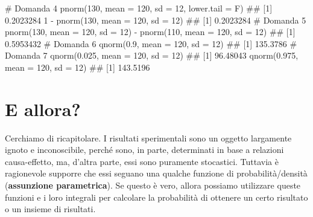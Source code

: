 \documentclass[a4paper,12pt,oneside]{book}
\newenvironment{Shaded}{\begin{snugshade}}{\end{snugshade}}
\newcommand{\DecValTok}[1]{#1}
\newcommand{\FloatTok}[1]{#1}
\newcommand{\SpecialCharTok}[1]{#1}
\newcommand{\CommentTok}[1]{#1}
\newcommand{\DocumentationTok}[1]{#1}
\newcommand{\FunctionTok}[1]{#1}
\newcommand{\AttributeTok}[1]{#1}
\newcommand{\NormalTok}[1]{#1}
\begin{document}
\begin{Shaded}
\begin{Highlighting}[]
\CommentTok{\# Domanda 4}
\FunctionTok{pnorm}\NormalTok{(}\DecValTok{130}\NormalTok{, }\AttributeTok{mean =} \DecValTok{120}\NormalTok{, }\AttributeTok{sd =} \DecValTok{12}\NormalTok{, }\AttributeTok{lower.tail =}\NormalTok{ F)}
\DocumentationTok{\#\# [1] 0.2023284}
\DecValTok{1} \SpecialCharTok{{-}} \FunctionTok{pnorm}\NormalTok{(}\DecValTok{130}\NormalTok{, }\AttributeTok{mean =} \DecValTok{120}\NormalTok{, }\AttributeTok{sd =} \DecValTok{12}\NormalTok{)}
\DocumentationTok{\#\# [1] 0.2023284}
\CommentTok{\# Domanda 5}
\FunctionTok{pnorm}\NormalTok{(}\DecValTok{130}\NormalTok{, }\AttributeTok{mean =} \DecValTok{120}\NormalTok{, }\AttributeTok{sd =} \DecValTok{12}\NormalTok{) }\SpecialCharTok{{-}} \FunctionTok{pnorm}\NormalTok{(}\DecValTok{110}\NormalTok{, }\AttributeTok{mean =} \DecValTok{120}\NormalTok{, }\AttributeTok{sd =} \DecValTok{12}\NormalTok{)}
\DocumentationTok{\#\# [1] 0.5953432}
\CommentTok{\# Domanda 6}
\FunctionTok{qnorm}\NormalTok{(}\FloatTok{0.9}\NormalTok{, }\AttributeTok{mean =} \DecValTok{120}\NormalTok{, }\AttributeTok{sd =} \DecValTok{12}\NormalTok{)}
\DocumentationTok{\#\# [1] 135.3786}
\CommentTok{\# Domanda 7}
\FunctionTok{qnorm}\NormalTok{(}\FloatTok{0.025}\NormalTok{, }\AttributeTok{mean =} \DecValTok{120}\NormalTok{, }\AttributeTok{sd =} \DecValTok{12}\NormalTok{)}
\DocumentationTok{\#\# [1] 96.48043}
\FunctionTok{qnorm}\NormalTok{(}\FloatTok{0.975}\NormalTok{, }\AttributeTok{mean =} \DecValTok{120}\NormalTok{, }\AttributeTok{sd =} \DecValTok{12}\NormalTok{)}
\DocumentationTok{\#\# [1] 143.5196}
\end{Highlighting}
\end{Shaded}

\hypertarget{e-allora}{%
\section{E allora?}\label{e-allora}}

Cerchiamo di ricapitolare. I risultati sperimentali sono un oggetto largamente ignoto e inconoscibile, perché sono, in parte, determinati in base a relazioni causa-effetto, ma, d'altra parte, essi sono puramente stocastici. Tuttavia è ragionevole supporre che essi seguano una qualche funzione di probabilità/densità (\textbf{assunzione parametrica}). Se questo è vero, allora possiamo utilizzare queste funzioni e i loro integrali per calcolare la probabilità di ottenere un certo risultato o un insieme di risultati.
\end{document}
